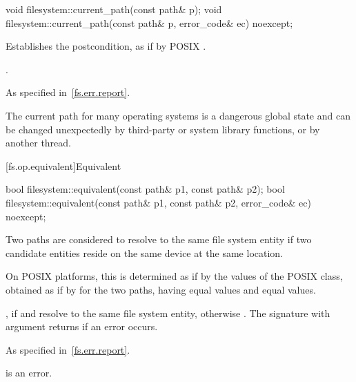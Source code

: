 %
\begin{itemdecl}
void filesystem::current_path(const path& p);
void filesystem::current_path(const path& p, error_code& ec) noexcept;
\end{itemdecl}

\begin{itemdescr}
\pnum
\effects
Establishes the postcondition, as if by POSIX .

\pnum
\ensures
{}.

\pnum
\throws
As specified in~\ref{fs.err.report}.

\pnum
\begin{note}
The current path for many operating systems is a dangerous
  global state and can be changed unexpectedly by third-party or system
  library functions, or by another thread.
\end{note}
\end{itemdescr}

[fs.op.equivalent]{Equivalent}

%
\begin{itemdecl}
bool filesystem::equivalent(const path& p1, const path& p2);
bool filesystem::equivalent(const path& p1, const path& p2, error_code& ec) noexcept;
\end{itemdecl}

\begin{itemdescr}
\pnum
Two paths are considered to resolve to the same file system entity if two
  candidate entities reside on the same device at the same location.
  \begin{note}
  On POSIX platforms, this is
  determined as if by the values of the POSIX  class,
  obtained as if by  for the two paths, having equal  values
  and equal  values.
  \end{note}

\pnum
\returns
{}, if  and  resolve to the same file
  system entity, otherwise . The signature with argument 
  returns  if an error occurs.

\pnum
\throws
As specified in~\ref{fs.err.report}.

\pnum
\remarks
{} is an error.
\end{itemdescr}


